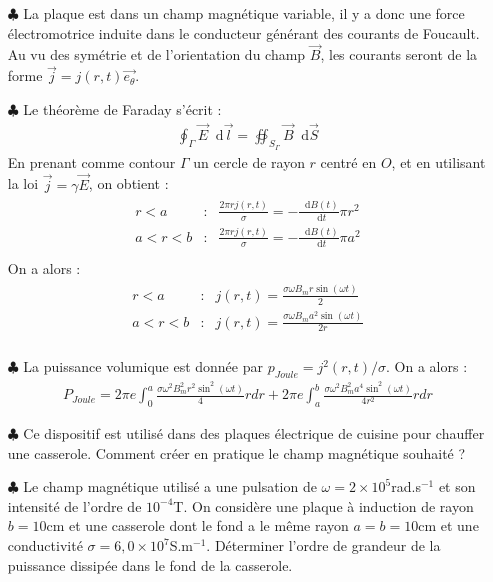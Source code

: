 \documentclass{report}
\newcommand*\dif{\mathop{}\!\mathrm{d}}
\begin{document}
\begin{itemize}

	\item[$\clubsuit$] La plaque est dans un champ magnétique variable, il y a donc une force électromotrice induite dans le conducteur générant des courants de Foucault. Au vu des symétrie et de l'orientation du champ $\vec{B}$, les courants seront de la forme $\vec{j}=j(r,t)\vec{e_\theta}$.
	
	\item[$\clubsuit$] Le théorème de Faraday s'écrit :
	\begin{align*}
		\oint_\Gamma\vec{E}\dif\vec{l}=\oiint_{S_\Gamma}\vec{B}\dif\vec{S}
	\end{align*}
	En prenant comme contour $\Gamma$ un cercle de rayon $r$ centré en $O$, et en utilisant la loi $\vec{j}=\gamma\vec{E}$, on obtient :
	\begin{align*}
	\begin{array}{ccc}
	r<a & : & \frac{2\pi rj(r,t)}{\sigma}=-\frac{\dif B(t)}{\dif t}\pi r^2\\
	a<r<b & : & \frac{2\pi rj(r,t)}{\sigma}=-\frac{\dif B(t)}{\dif t}\pi a^2\\
	\end{array}
	\end{align*}		
On a alors :
	\begin{align*}
	\begin{array}{ccc}
	r<a & : & j(r,t)=\frac{\sigma\omega B_m r\sin(\omega t)}{2}\\
	a<r<b & : &  j(r,t)=\frac{\sigma\omega B_m a^2\sin(\omega t)}{2r}\\
	\end{array}
	\end{align*}		
		
	\item[$\clubsuit$] La puissance volumique est donnée par $p_{Joule}= j^2(r,t)/\sigma$. On a alors :
	\begin{align*}
		P_{Joule}=2\pi e\int_0^a \frac{\sigma\omega^2 B_m^2 r^2\sin^2(\omega t)}{4}rdr+2\pi e\int_a^b \frac{\sigma\omega^2 B_m^2 a^4\sin^2(\omega t)}{4r^2}rdr
	\end{align*}
	
	\item[$\clubsuit$] Ce dispositif est utilisé dans des plaques électrique de cuisine pour chauffer une casserole. Comment créer en pratique le champ magnétique souhaité ?
	
	\item[$\clubsuit$] Le champ magnétique utilisé a une pulsation de $\omega=2\times10^{5}$rad.s$^{-1}$ et son intensité de l'ordre de $10^{-4}$T. On considère une plaque à induction de rayon $b=10$cm et une casserole dont le fond a le même rayon $a=b=10$cm et une conductivité $\sigma=6,0\times10^{7}$S.m$^{-1}$. Déterminer l'ordre de grandeur de la puissance dissipée dans le fond de la casserole. 

\end{itemize}
\end{document}
